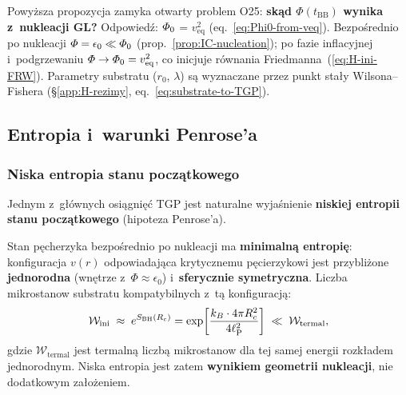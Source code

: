 \begin{remark}
\label{rem:O25-bridge}
Powy\.zsza propozycja zamyka otwarty problem O25:
\textbf{sk\k{a}d $\Phi(t_{\mathrm{BB}})$ wynika z~nukleacji GL?}
Odpowied\'z: $\varPhi_0$ = $v_{\mathrm{eq}}^2$ (eq.~\ref{eq:Phi0-from-veq}).
Bezpo\'srednio po nukleacji $\varPhi = \epsilon_0 \ll \varPhi_0$
(prop.~\ref{prop:IC-nucleation}); po fazie inflacyjnej
i~podgrzewaniu $\varPhi \to \varPhi_0 = v_{\mathrm{eq}}^2$,
co inicjuje r\'ownania Friedmanna~(\ref{eq:H-ini-FRW}).
Parametry substratu ($r_0$, $\lambda$) s\k{a} wyznaczane
przez punkt sta\l{}y Wilsona--Fishera
(\S\ref{app:H-rezimy}, eq.~\ref{eq:substrate-to-TGP}).
\end{remark}

\subsection{Entropia i~warunki Penrose'a}%
\label{app:G-entropia}

\subsubsection{Niska entropia stanu pocz\k{a}tkowego}

Jednym z~g\l{}\'ownych osi\k{a}gni\k{e}\'c TGP jest naturalne
wyja\'snienie \textbf{niskiej entropii stanu pocz\k{a}tkowego}
(hipoteza Penrose'a).

\begin{proposition}\label{prop:low-entropy}
Stan p\k{e}cherzyka bezpo\'srednio po nukleacji ma
\textbf{minimaln\k{a} entropi\k{e}}: konfiguracja $v(r)$
odpowiadaj\k{a}ca krytycznemu p\k{e}cierzykowi jest
przybli\.zone \textbf{jednorodna} (wn\k{e}trze z~$\Phi \approx \epsilon_0$)
i~\textbf{sferycznie symetryczna}. Liczba mikrostanow
substratu kompatybilnych z~t\k{a} konfiguracj\k{a}:
\begin{equation}\label{eq:low-entropy-count}
    \mathcal{W}_\mathrm{ini} \;\approx\; e^{S_\mathrm{BH}(R_c)}
    = \exp\!\left[\frac{k_B\cdot 4\pi R_c^2}{4\ell_{\mathrm{P}}^2}\right]
    \;\ll\; \mathcal{W}_\mathrm{termal},
\end{equation}
gdzie $\mathcal{W}_\mathrm{termal}$ jest termaln\k{a}
liczb\k{a} mikrostanow dla tej samej energii rozk\l{}adem
jednorodnym. Niska entropia jest zatem \textbf{wynikiem
geometrii nukleacji}, nie dodatkowym za\l{}o\.zeniem.
\end{proposition}


